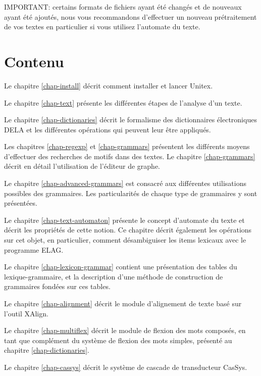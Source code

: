 \bigskip
\noindent IMPORTANT: certains formats de fichiers ayant été changés et de nouveaux ayant été
ajoutés, nous vous recommandons d'effectuer un nouveau prétraitement de vos textes en particulier si
vous utilisez l'automate du texte.

\clearpage

\section*{Contenu}
\noindent Le chapitre \ref{chap-install} décrit comment installer et lancer Unitex.

\bigskip \noindent Le chapitre \ref{chap-text} présente les différentes étapes de l'analyse d'un
texte.

\bigskip \noindent Le chapitre \ref{chap-dictionaries} décrit le formalisme 
des dictionnaires électroniques DELA et les différentes opérations qui peuvent leur être appliqués.

\bigskip \noindent Les chapitres \ref{chap-regexp} et \ref{chap-grammars}
présentent les différents moyens d’effectuer des recherches de motifs dans des textes.
Le chapitre \ref{chap-grammars} décrit en détail l'utilisation de l'éditeur de graphe.

\bigskip \noindent Le chapitre \ref{chap-advanced-grammars} est consacré aux différentes
utilisations possibles des grammaires. Les particularités de chaque type de grammaires y sont
présentées.

\bigskip \noindent Le chapitre \ref{chap-text-automaton} présente le concept d'automate du texte 
et décrit les propriétés de cette notion. Ce chapitre  décrit également les opérations sur cet
objet, en particulier, comment désambiguiser les items lexicaux avec le programme ELAG.

\bigskip \noindent Le chapitre \ref{chap-lexicon-grammar} contient une présentation des tables du
lexique-grammaire, et la description d'une méthode de construction de  grammaires fondées sur ces
tables.

\bigskip \noindent Le chapitre \ref{chap-alignment} décrit le module d'alignement de texte basé sur
l'outil XAlign.

\bigskip \noindent Le chapitre \ref{chap-multiflex} décrit le module de flexion des mots composés,
en tant que complément du système de flexion des mots simples, présenté au chapitre
\ref{chap-dictionaries}.

\bigskip \noindent Le chapitre \ref{chap-cassys} décrit le système de cascade de transducteur
CasSys.

